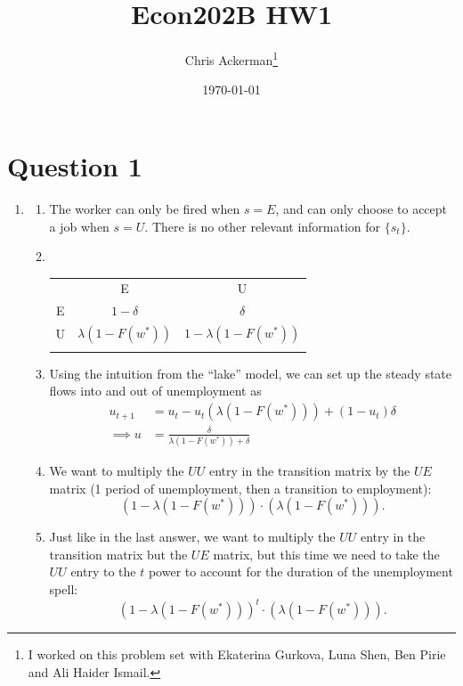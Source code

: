 \documentclass[11pt]{article}
\author{Chris Ackerman\thanks{I worked on this problem set with Ekaterina Gurkova, Luna Shen, Ben Pirie and Ali Haider Ismail.}}
\date{\today}
\title{Econ202B HW1}
\begin{document}
\maketitle
\tableofcontents

\newpage

\section{Question 1}
\label{sec:org67d4e06}

  \begin{enumerate}
\item
\begin{enumerate}
\item The worker can only be fired when $s = E$, and can only choose to accept a job when $s = U$. There is no other relevant information for $\{s_t\}$.
\item $ $ \\
\begin{center}
\begin{tabular}[]{ccc}
& E & U \\ \cline{2-3}
E & \multicolumn{1}{|c}{$1 - \delta$} & \multicolumn{1}{|c|}{$\delta$} \\ \cline{2-3}
U & \multicolumn{1}{|c}{$\lambda (1 - F(w^*))$} & \multicolumn{1}{|c|}{$1 - \lambda (1 - F(w^*))$} \\ \cline{2-3}\\
\end{tabular}
\end{center}
\item Using the intuition from the ``lake'' model, we can set up the steady state flows into and out of unemployment as
\begin{align*}
u_{t + 1} &= u_t - u_t (\lambda (1 - F(w^*))) + (1 - u_t) \delta \\
\implies u &= \frac{\delta}{\lambda (1 - F(w^*)) + \delta}
\end{align*}
\item We want to multiply the $UU$ entry in the transition matrix by the $UE$ matrix (1 period of unemployment, then a transition to employment):
\[
(1 - \lambda(1 - F(w^*)))\cdot (\lambda(1 - F(w^*))).
\]
\item Just like in the last answer, we want to multiply the $UU$ entry in the transition matrix but the $UE$ matrix, but this time we need to take the $UU$ entry to the $t$ power to account for the duration of the unemployment spell:
\[
(1 - \lambda(1 - F(w^*)))^t \cdot (\lambda(1 - F(w^*))).
\]

\end{enumerate}
\end{enumerate}
\end{document}
